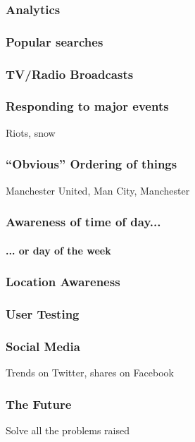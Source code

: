 \documentclass{beamer}
\begin{document}
\begin{frame}
  \frametitle{Analytics}
\end{frame}

\begin{frame}
  \frametitle{Popular searches}
\end{frame}

\begin{frame}
  \frametitle{TV/Radio Broadcasts}
\end{frame}

\begin{frame}
  \frametitle{Responding to major events}
  Riots, snow
\end{frame}

\begin{frame}
  \frametitle{``Obvious'' Ordering of things}
  Manchester United, Man City, Manchester
\end{frame}

\begin{frame}
  \frametitle{Awareness of time of day...}
  \framesubtitle{... or day of the week}
\end{frame}

\begin{frame}
  \frametitle{Location Awareness}
\end{frame}

\begin{frame}
  \frametitle{User Testing}
\end{frame}

\begin{frame}
  \frametitle{Social Media}
  Trends on Twitter, shares on Facebook
\end{frame}

\begin{frame}
  \frametitle{The Future}
  Solve all the problems raised
\end{frame}
\end{document}
